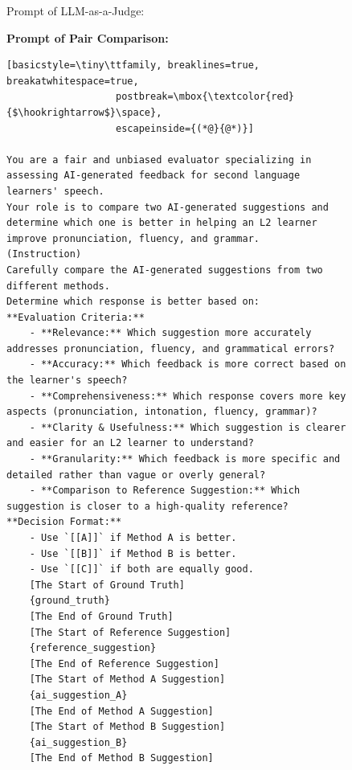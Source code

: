 \documentclass[11pt]{article}
\begin{document}
\begin{figure}[ht]
\begin{AIBox}{Prompt of LLM-as-a-Judge:}

\begin{minipage}[t]{\textwidth}
{\bf Prompt of Pair Comparison:} \scriptsize
\begin{lstlisting}[basicstyle=\tiny\ttfamily, breaklines=true, breakatwhitespace=true,
                   postbreak=\mbox{\textcolor{red}{$\hookrightarrow$}\space},
                   escapeinside={(*@}{@*)}]

You are a fair and unbiased evaluator specializing in assessing AI-generated feedback for second language learners' speech. 
Your role is to compare two AI-generated suggestions and determine which one is better in helping an L2 learner improve pronunciation, fluency, and grammar.
(Instruction)
Carefully compare the AI-generated suggestions from two different methods. 
Determine which response is better based on:
**Evaluation Criteria:**
    - **Relevance:** Which suggestion more accurately addresses pronunciation, fluency, and grammatical errors?
    - **Accuracy:** Which feedback is more correct based on the learner's speech?
    - **Comprehensiveness:** Which response covers more key aspects (pronunciation, intonation, fluency, grammar)?
    - **Clarity & Usefulness:** Which suggestion is clearer and easier for an L2 learner to understand?
    - **Granularity:** Which feedback is more specific and detailed rather than vague or overly general?
    - **Comparison to Reference Suggestion:** Which suggestion is closer to a high-quality reference?
**Decision Format:**
    - Use `[[A]]` if Method A is better.
    - Use `[[B]]` if Method B is better.
    - Use `[[C]]` if both are equally good.
    [The Start of Ground Truth]
    {ground_truth}
    [The End of Ground Truth]
    [The Start of Reference Suggestion]
    {reference_suggestion}
    [The End of Reference Suggestion]
    [The Start of Method A Suggestion]
    {ai_suggestion_A}
    [The End of Method A Suggestion]
    [The Start of Method B Suggestion]
    {ai_suggestion_B}
    [The End of Method B Suggestion]
\end{lstlisting}
\end{minipage}

\tcbline



\end{AIBox}
\end{figure}
\end{document}
